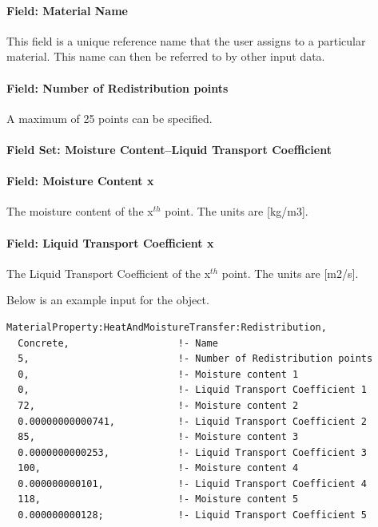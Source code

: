 \paragraph{Field: Material Name}\label{field-material-name-3}

This field is a unique reference name that the user assigns to a particular material. This name can then be referred to by other input data.

\paragraph{Field: Number of Redistribution points}\label{field-number-of-redistribution-points}

A maximum of 25 points can be specified.

\paragraph{Field Set: Moisture Content--Liquid Transport Coefficient}\label{field-set-moisture-content-liquid-transport-coefficient-1}

\paragraph{Field: Moisture Content x}\label{field-moisture-content-x-2}

The moisture content of the x\(^{th}\) point. The units are {[}kg/m3{]}.

\paragraph{Field: Liquid Transport Coefficient x}\label{field-liquid-transport-coefficient-x-1}

The Liquid Transport Coefficient of the x\(^{th}\) point. The units are {[}m2/s{]}.

Below is an example input for the object.

\begin{lstlisting}
MaterialProperty:HeatAndMoistureTransfer:Redistribution,
  Concrete,                   !- Name
  5,                          !- Number of Redistribution points
  0,                          !- Moisture content 1
  0,                          !- Liquid Transport Coefficient 1
  72,                         !- Moisture content 2
  0.00000000000741,           !- Liquid Transport Coefficient 2
  85,                         !- Moisture content 3
  0.0000000000253,            !- Liquid Transport Coefficient 3
  100,                        !- Moisture content 4
  0.000000000101,             !- Liquid Transport Coefficient 4
  118,                        !- Moisture content 5
  0.000000000128;             !- Liquid Transport Coefficient 5
\end{lstlisting}

